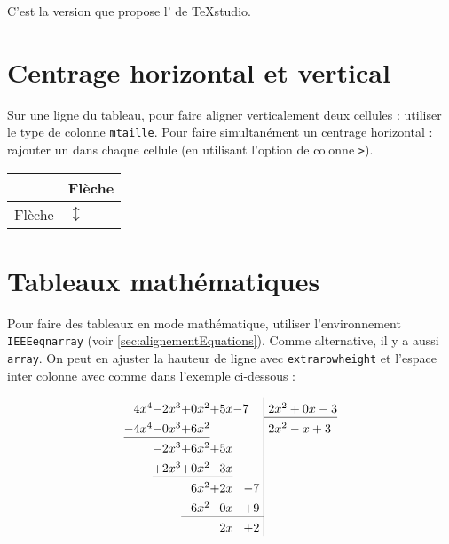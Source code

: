C'est la version que propose l' de TeXstudio.





\section{Centrage horizontal et vertical}

Sur une ligne du tableau, pour faire aligner verticalement deux cellules : utiliser le type de colonne \texttt{m{taille}}. Pour faire simultanément un centrage horizontal : rajouter un \texttt{\centering} dans chaque cellule (en utilisant l'option de colonne \texttt{>{}}).


\begin{LTXexample}[pos=o,width=.25\linewidth]
\begin{center}
  \begin{tabular}{|>{\centering}m{1cm}|>{\centering}m{1cm}|}
    \hline 
    {\Huge $\updownarrow$} & Flèche \tabularnewline
    \hline
    Flèche & {\Huge $\updownarrow$} \tabularnewline 
    \hline
  \end{tabular} 
\end{center}
\end{LTXexample}





\section{Tableaux mathématiques}
\label{sec:tableauxMaths}

Pour faire des tableaux en mode mathématique, utiliser l'environnement \texttt{IEEEeqnarray} (voir \ref{sec:alignementEquations}). Comme alternative, il y a aussi \texttt{array}. On peut en ajuster la hauteur de ligne avec \texttt{extrarowheight} et l'espace inter colonne avec \texttt{\arraycolsep} comme dans l'exemple ci-dessous :
\begin{LTXexample}[pos=o]
\[
  \setlength\extrarowheight{4pt}
  \setlength{\arraycolsep}{0pt}
  \begin{array}{rrrrr<{~}|>{~}l}
    4x^4 & -2x^3 & +0x^2 & +5x & -7 \hspace{0.3cm} & 2x^2+0x-3\\
    \cline{6-6}
    -4x^4 & -0x^3 & +6x^2 & & & 2x^2-x+3\\
    \cline{1-3}
    & -2x^3 & +6x^2 & +5x & & \\
    & +2x^3 & +0x^2 & -3x & & \\
    \cline{2-4}
    & & 6x^2 & +2x & -7 &\\
    & & -6x^2 & -0x & +9 &\\
    \cline{3-5}
    & & & 2x & +2 & \\
  \end{array}
\]
\end{LTXexample}

